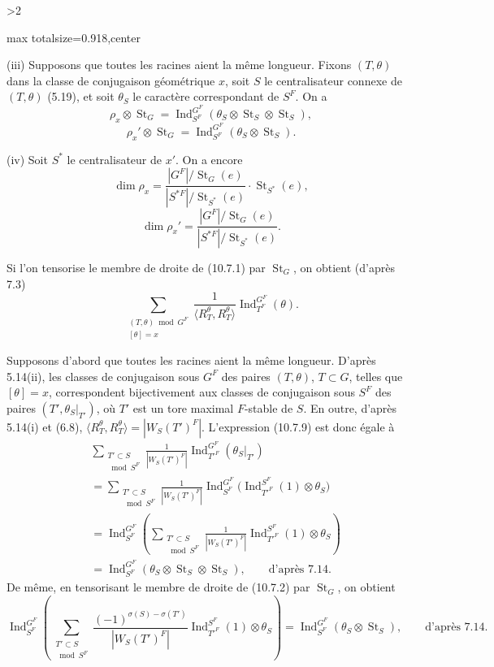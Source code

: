 \documentclass[9pt,twoside]{extarticle}
\newcommand{\EditionPage}[3]{%
  \ifnum#1>2\clearpage\fi
  \pdfbookmark[1]{Printed page #2}{fr-folio-#2}%
  \hypertarget{fr-physical-#1}{}%
  \noindent\begin{adjustbox}{max totalsize={\textwidth}{0.918\textheight},center}
  \begin{minipage}[t]{\textwidth}
  \fontsize{9.4}{11.1}\selectfont\justifying
  #3
  \end{minipage}
  \end{adjustbox}%
}
\begin{document}
\EditionPage{57}{158}{%
(iii) Supposons que toutes les racines aient la même longueur. Fixons \((T,\theta)\) dans la classe de conjugaison géométrique \(x\), soit \(S\) le centralisateur connexe de \((T,\theta)\) (5.19), et soit \(\theta_S\) le caractère correspondant de \(S^F\). On a \[
\tag{10.7.5}
\rho_x\otimes\operatorname{St}_G
=
\operatorname{Ind}_{S^F}^{G^F}(\theta_S\otimes\operatorname{St}_S\otimes\operatorname{St}_S),
\]  \[
\tag{10.7.6}
\rho_x'\otimes\operatorname{St}_G
=
\operatorname{Ind}_{S^F}^{G^F}(\theta_S\otimes\operatorname{St}_S).
\]\par

(iv) Soit \(S^*\) le centralisateur de \(x'\). On a encore \[
\tag{10.7.7}
\dim\rho_x
=
\frac{|G^F|/\operatorname{St}_G(e)}{|S^{*F}|/\operatorname{St}_{S^*}(e)}\cdot\operatorname{St}_{S^*}(e),
\]  \[
\tag{10.7.8}
\dim\rho_x'
=
\frac{|G^F|/\operatorname{St}_G(e)}{|S^{*F}|/\operatorname{St}_{S^*}(e)}.
\]\par

Si l'on tensorise le membre de droite de (10.7.1) par \(\operatorname{St}_G\), on obtient (d'après 7.3) \[
\tag{10.7.9}
\sum_{\substack{(T,\theta)\bmod G^F\\{}[\theta]=x}}
\frac1{\langle R_T^\theta,R_T^\theta\rangle}
\operatorname{Ind}_{T^F}^{G^F}(\theta).
\]\par

Supposons d'abord que toutes les racines aient la même longueur. D'après 5.14(ii), les classes de conjugaison sous \(G^F\) des paires \((T,\theta)\), \(T\subset G\), telles que \([\theta]=x\), correspondent bijectivement aux classes de conjugaison sous \(S^F\) des paires \((T',\theta_S|_{T'})\), où \(T'\) est un tore maximal \(F\)-stable de \(S\). En outre, d'après 5.14(i) et (6.8), \(\langle R_T^\theta,R_T^\theta\rangle=|W_S(T')^F|\). L'expression (10.7.9) est donc égale à \[
\begin{aligned}
&\sum_{\substack{T'\subset S\\\bmod S^F}}
\frac1{|W_S(T')^F|}\operatorname{Ind}_{T'^F}^{G^F}(\theta_S|_{T'})\\
&=\sum_{\substack{T'\subset S\\\bmod S^F}}
\frac1{|W_S(T')^F|}
\operatorname{Ind}_{S^F}^{G^F}\bigl(\operatorname{Ind}_{T'^F}^{S^F}(1)\otimes\theta_S\bigr)\\
&=\operatorname{Ind}_{S^F}^{G^F}\left(
\sum_{\substack{T'\subset S\\\bmod S^F}}
\frac1{|W_S(T')^F|}\operatorname{Ind}_{T'^F}^{S^F}(1)\otimes\theta_S
\right)\\
&=\operatorname{Ind}_{S^F}^{G^F}(\theta_S\otimes\operatorname{St}_S\otimes\operatorname{St}_S),
\qquad\text{d'après 7.14}.
\end{aligned}
\] De même, en tensorisant le membre de droite de (10.7.2) par \(\operatorname{St}_G\), on obtient \[
\operatorname{Ind}_{S^F}^{G^F}\left(
\sum_{\substack{T'\subset S\\\bmod S^F}}
\frac{(-1)^{\sigma(S)-\sigma(T')}}{|W_S(T')^F|}
\operatorname{Ind}_{T'^F}^{S^F}(1)\otimes\theta_S
\right)
=
\operatorname{Ind}_{S^F}^{G^F}(\theta_S\otimes\operatorname{St}_S),
\qquad\text{d'après 7.14}.
\]\par

}
\end{document}
